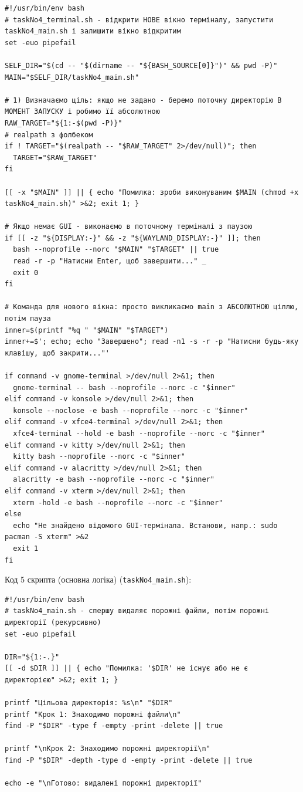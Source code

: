 \documentclass[12pt,a4paper]{article}
\begin{document}
    \begin{verbatim}
#!/usr/bin/env bash
# taskNo4_terminal.sh - відкрити НОВЕ вікно терміналу, запустити taskNo4_main.sh і залишити вікно відкритим
set -euo pipefail

SELF_DIR="$(cd -- "$(dirname -- "${BASH_SOURCE[0]}")" && pwd -P)"
MAIN="$SELF_DIR/taskNo4_main.sh"

# 1) Визначаємо ціль: якщо не задано - беремо поточну директорію В МОМЕНТ ЗАПУСКУ і робимо її абсолютною
RAW_TARGET="${1:-$(pwd -P)}"
# realpath з фолбеком
if ! TARGET="$(realpath -- "$RAW_TARGET" 2>/dev/null)"; then
  TARGET="$RAW_TARGET"
fi

[[ -x "$MAIN" ]] || { echo "Помилка: зроби виконуваним $MAIN (chmod +x taskNo4_main.sh)" >&2; exit 1; }

# Якщо немає GUI - виконаємо в поточному терміналі з паузою
if [[ -z "${DISPLAY:-}" && -z "${WAYLAND_DISPLAY:-}" ]]; then
  bash --noprofile --norc "$MAIN" "$TARGET" || true
  read -r -p "Натисни Enter, щоб завершити..." _
  exit 0
fi

# Команда для нового вікна: просто викликаємо main з АБСОЛЮТНОЮ ціллю, потім пауза
inner=$(printf "%q " "$MAIN" "$TARGET")
inner+=$'; echo; echo "Завершено"; read -n1 -s -r -p "Натисни будь-яку клавішу, щоб закрити..."'

if command -v gnome-terminal >/dev/null 2>&1; then
  gnome-terminal -- bash --noprofile --norc -c "$inner"
elif command -v konsole >/dev/null 2>&1; then
  konsole --noclose -e bash --noprofile --norc -c "$inner"
elif command -v xfce4-terminal >/dev/null 2>&1; then
  xfce4-terminal --hold -e bash --noprofile --norc -c "$inner"
elif command -v kitty >/dev/null 2>&1; then
  kitty bash --noprofile --norc -c "$inner"
elif command -v alacritty >/dev/null 2>&1; then
  alacritty -e bash --noprofile --norc -c "$inner"
elif command -v xterm >/dev/null 2>&1; then
  xterm -hold -e bash --noprofile --norc -c "$inner"
else
  echo "Не знайдено відомого GUI-термінала. Встанови, напр.: sudo pacman -S xterm" >&2
  exit 1
fi
    \end{verbatim}

    Код 5 скрипта (основна логіка) (\texttt{taskNo4\_main.sh}):

    \begin{verbatim}
#!/usr/bin/env bash
# taskNo4_main.sh - спершу видаляє порожні файли, потім порожні директорії (рекурсивно)
set -euo pipefail

DIR="${1:-.}"
[[ -d $DIR ]] || { echo "Помилка: '$DIR' не існує або не є директорією" >&2; exit 1; }

printf "Цільова директорія: %s\n" "$DIR"
printf "Крок 1: Знаходимо порожні файли\n"
find -P "$DIR" -type f -empty -print -delete || true

printf "\nКрок 2: Знаходимо порожні директорії\n"
find -P "$DIR" -depth -type d -empty -print -delete || true

echo -e "\nГотово: видалені порожні директорії"
    \end{verbatim}
\end{document}
